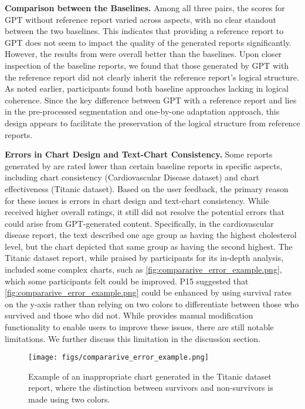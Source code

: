 \textbf{Comparison between the Baselines.} 
Among all three pairs, the scores for GPT without reference report varied across aspects, with no clear standout between the two baselines. 
This indicates that providing a reference report to GPT does not seem to impact the quality of the generated reports significantly. 
However, the results from \system{} were overall better than the baselines. 
Upon closer inspection of the baseline reports, we found that those generated by GPT with the reference report did not clearly inherit the reference report's logical structure. 
As noted earlier, participants found both baseline approaches lacking in logical coherence. 
Since the key difference between GPT with a reference report and \system{} lies in the pre-processed segmentation and one-by-one adaptation approach, this design appears to facilitate the preservation of the logical structure from reference reports.

\textbf{Errors in Chart Design and Text-Chart Consistency.} 
Some reports generated by \system{} are rated lower than certain baseline reports in specific aspects, including chart consistency (Cardiovascular Disease dataset) and chart effectiveness (Titanic dataset). 
Based on the user feedback, the primary reason for these issues is errors in chart design and text-chart consistency. 
While \system{} received higher overall ratings, it still did not resolve the potential errors that could arise from GPT-generated content. 
Specifically, in the cardiovascular disease report, the text described one age group as having the highest cholesterol level, but the chart depicted that same group as having the second highest.
The Titanic dataset report, while praised by participants for its in-depth analysis, included some complex charts, such as \autoref{fig:compararive_error_example.png}, which some participants felt could be improved. 
P15 suggested that \autoref{fig:compararive_error_example.png} could be enhanced by using survival rates on the y-axis rather than relying on two colors to differentiate between those who survived and those who did not.
While \system{} provides manual modification functionality to enable users to improve these issues, there are still notable limitations. We further discuss this limitation in the discussion section.

\begin{figure}[!htb] 
  \centering
  \texttt{[image: figs/compararive\_error\_example.png]}
  \caption{
    Example of an inappropriate chart generated in the Titanic dataset report, where the distinction between survivors and non-survivors is made using two colors. 
  }
  \label{fig:compararive_error_example.png}
\end{figure}